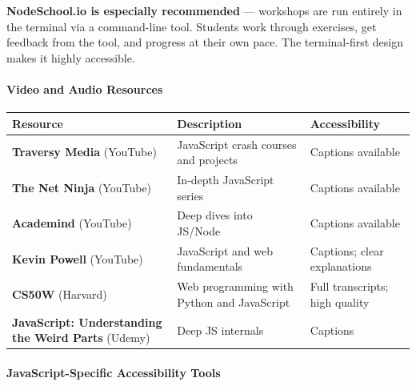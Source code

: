 \documentclass[
  justified,
  openright,
]{tufte-book}
\let\subsubsection\paragraph
\let\paragraph\paragraph
\let\subsubsection\paragraph
\let\paragraph\paragraph
\begin{document}
\textbf{NodeSchool.io is especially recommended} --- workshops are run
entirely in the terminal via a command-line tool. Students work through
exercises, get feedback from the tool, and progress at their own pace.
The terminal-first design makes it highly accessible.

\subsubsection{Video and Audio
Resources}\label{video-and-audio-resources}

{\def\LTcaptype{none} %
\begin{longtable}[]{@{}
  >{\raggedright\arraybackslash}p{}
  >{\raggedright\arraybackslash}p{}
  >{\raggedright\arraybackslash}p{}@{}}
\toprule\noalign{}
\begin{minipage}[b]{\linewidth}\raggedright
Resource
\end{minipage} & \begin{minipage}[b]{\linewidth}\raggedright
Description
\end{minipage} & \begin{minipage}[b]{\linewidth}\raggedright
Accessibility
\end{minipage} \\
\midrule\noalign{}
\endhead
\bottomrule\noalign{}
\endlastfoot
\textbf{Traversy Media} (YouTube) & JavaScript crash courses and
projects & Captions available \\
\textbf{The Net Ninja} (YouTube) & In-depth JavaScript series & Captions
available \\
\textbf{Academind} (YouTube) & Deep dives into JS/Node & Captions
available \\
\textbf{Kevin Powell} (YouTube) & JavaScript and web fundamentals &
Captions; clear explanations \\
\textbf{CS50W} (Harvard) & Web programming with Python and JavaScript &
Full transcripts; high quality \\
\textbf{JavaScript: Understanding the Weird Parts} (Udemy) & Deep JS
internals & Captions \\
\end{longtable}
}

\subsubsection{JavaScript-Specific Accessibility
Tools}\label{javascript-specific-accessibility-tools}
\end{document}
